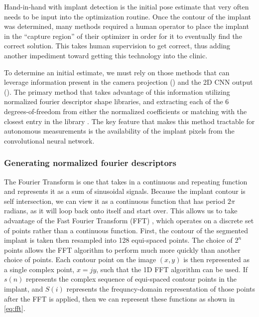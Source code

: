 Hand-in-hand with implant detection is the initial pose estimate that very often needs to be input into the optimization routine. Once the contour of the implant was determined, many methods required a human operator to place the implant in the ``capture region'' of their optimizer in order for it to eventually find the correct solution. This takes human supervision to get correct, thus adding another impediment toward getting this technology into the clinic.

To determine an initial estimate, we must rely on those methods that can leverage information present in the camera projection () and the 2D CNN output (). The primary method that takes advantage of this information utilizing normalized fourier descriptor shape libraries, and extracting each of the 6 degrees-of-freedom from either the normalized coefficients or matching with the closest entry in the library \cite{wallaceAnalysisThreedimensionalMovement1980,wallaceEfficientThreedimensionalAircraft1980,banksModelBased3D1992,banksAccurateMeasurementThreedimensional1996}. The key feature that makes this method tractable for autonomous measurements is the availability of the implant pixels from the convolutional neural network.

\subsubsection{Generating normalized fourier descriptors}
\label{sec:nfd}
The Fourier Transform is one that takes in a continuous and repeating function and represents it as a sum of sinusoidal signals. Because the implant contour is self intersection, we can view it as a continuous function that has period $2\pi$ radians, as it will loop back onto itself and start over. This allows us to take advantage of the Fast Fourier Transform (FFT) \cite{cochranWhatFastFourier1967}, which operates on a discrete set of points rather than a continuous function. First, the contour of the segmented implant is taken then resampled into 128 equi-spaced points. The choice of $2^n$ points allows the FFT algorithm to perform much more quickly than another choice of points. Each contour point on the image $(x, y)$ is then represented as a single complex point, $x = jy$, such that the 1D FFT algorithm can be used. If $s(n)$ represents the complex sequence of equi-spaced contour points in the implant, and $S(i)$ represents the frequncy-domain representation of those points after the FFT is applied, then we can represent these functions as shown in \cref{eq:fft}.

